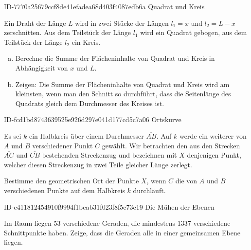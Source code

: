 \begin{exercise}
      {ID-7770a25679ccf8de41efadea68d403f4087edb6a}
      {Quadrat und Kreis}
  \ifproblem\problem\par
    Ein Draht der Länge $L$ wird in zwei
    Stücke der Längen $l_{1}=x$ und $l_{2}=L-x$
    zerschnitten. Aus dem Teilstück der Länge
    $l_{1}$ wird ein Quadrat gebogen, aus dem
    Teilstück der Länge $l_{2}$ ein Kreis.
    \begin{enumerate}[a)]
      \item Berechne die Summe der Flächeninhalte
            von Quadrat und Kreis in Abhängigkeit
            von $x$ und $L$.
      \item Zeigen: Die Summe der Flächeninhalte
            von Quadrat und Kreis wird am kleinsten,
            wenn man den Schnitt so durchführt, dass
            die Seitenlänge des Quadrats gleich dem
            Durchmesser des Kreises ist.
    \end{enumerate}
  \fi
\end{exercise}

\begin{exercise}
      {ID-fcd1bd8743639525e926d297e041d177cd5c7a06}
      {Ortskurve}
  \ifproblem\problem\par
    Es sei $k$ ein Halbkreis über einem Durchmesser
    $\overline{AB}$. Auf $k$ werde ein weiterer von
    $A$ und $B$ verschiedener Punkt $C$ gewählt. Wir
    betrachten den aus den Strecken $\overline{AC}$
    und $\overline{CB}$ bestehenden Streckenzug und
    bezeichnen mit $X$ denjenigen Punkt, welcher diesen
    Streckenzug in zwei Teile gleicher Länge zerlegt.
    \par
    Bestimme den geometrischen Ort der Punkte $X$,
    wenn $C$ die von $A$ und $B$ verschiedenen
    Punkte auf dem Halbkreis $k$ durchläuft.
  \fi
\end{exercise}

\begin{exercise}
      {ID-e411812454910f9994f1bcab31f023f8f5c73c19}
      {Die Mühen der Ebenen}
  \ifproblem\problem\par
    Im Raum liegen \num{53} verschiedene Geraden,
    die mindestens \num{1337} verschiedene
    Schnittpunkte haben. Zeige, dass die Geraden
    alle in einer gemeinsamen Ebene liegen.
  \fi
\end{exercise}

